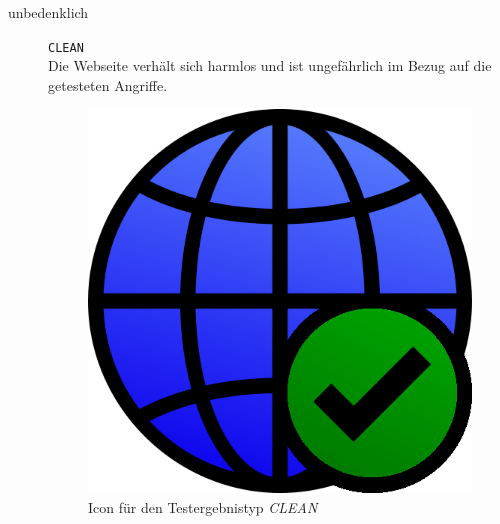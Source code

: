 \begin{description}
    \item[unbedenklich] \hfill \texttt{CLEAN} \\
    Die Webseite verhält sich harmlos und ist ungefährlich im Bezug auf die getesteten Angriffe.
	\begin{figure}[H]
		\centering
		\includegraphics[scale=0.2]{images/webifier-clean}
		\caption{Icon für den Testergebnistyp \textit{CLEAN}}
	\end{figure}


\end{description}
